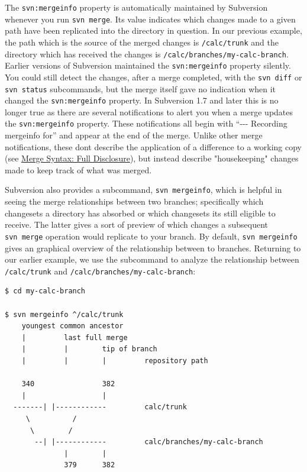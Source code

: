 The \texttt{svn:mergeinfo} property is automatically maintained by
Subversion whenever you run \texttt{svn\ merge}. Its value indicates
which changes made to a given path have been replicated into the
directory in question. In our previous example, the path which is the
source of the merged changes is \texttt{/calc/trunk} and the directory
which has received the changes is
\texttt{/calc/branches/my-calc-branch}. Earlier versions of Subversion
maintained the \texttt{svn:mergeinfo} property silently. You could still
detect the changes, after a merge completed, with the \texttt{svn\ diff}
or \texttt{svn\ status} subcommands, but the merge itself gave no
indication when it changed the \texttt{svn:mergeinfo} property. In
Subversion 1.7 and later this is no longer true as there are several
notifications to alert you when a merge updates the
\texttt{svn:mergeinfo} property. These notifications all begin with
``-\/-\/- Recording mergeinfo for'' and appear at the end of the merge.
Unlike other merge notifications, these don\textquotesingle t describe
the application of a difference to a working copy (see
\hyperref[svn.branchmerge.advanced.advancedsyntax]{Merge Syntax: Full
Disclosure}), but instead describe "housekeeping" changes made to keep
track of what was merged.

Subversion also provides a subcommand, \texttt{svn\ mergeinfo}, which is
helpful in seeing the merge relationships between two branches;
specifically which changesets a directory has absorbed or which
changesets it\textquotesingle s still eligible to receive. The latter
gives a sort of preview of which changes a subsequent
\texttt{svn\ merge} operation would replicate to your branch. By
default, \texttt{svn\ mergeinfo} gives an graphical overview of the
relationship between to branches. Returning to our earlier example, we
use the subcommand to analyze the relationship between
\texttt{/calc/trunk} and \texttt{/calc/branches/my-calc-branch}:

\begin{verbatim}
$ cd my-calc-branch

$ svn mergeinfo ^/calc/trunk
    youngest common ancestor
    |         last full merge
    |         |        tip of branch
    |         |        |         repository path

    340                382
    |                  |
  -------| |------------         calc/trunk
     \          /
      \        /
       --| |------------         calc/branches/my-calc-branch
              |        |
              379      382
\end{verbatim}

